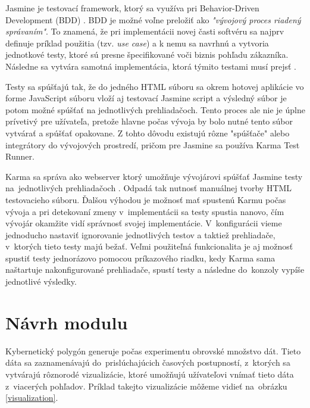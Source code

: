 \documentclass[
  printed, %
  twoside, %
  notable,   %
  nolof,   %
  nolot,   %
]{fithesis3}
\newcommand{\inquotes}[1]{{}"{}#1{}"{}}
\begin{document}
Jasmine je testovací framework, ktorý sa využíva pri Behavior-Driven Development (BDD) \cite{ragonha2013jasmine}. BDD je možné voľne preložiť ako \textit{"vývojový proces riadený správaním"}. To znamená, že pri implementácii novej časti softvéru sa najprv definuje príklad použitia (tzv. \textit{use case}) a k nemu sa navrhnú a vytvoria jednotkové testy, ktoré sú presne špecifikované voči biznis pohľadu zákazníka. Následne sa vytvára samotná implementácia, ktorá týmito testami musí prejsť \cite{nelson2013test}.

Testy sa spúšťajú tak, že do jedného HTML súboru sa okrem hotovej aplikácie vo forme JavaScript súboru vloží aj testovací Jasmine script a výsledný súbor je potom možné spúšťať na jednotlivých prehliadačoch. Tento proces ale nie je úplne prívetivý pre užívateľa, pretože hlavne počas vývoja by bolo nutné tento súbor vytvárať a spúšťať opakovane. Z tohto dôvodu existujú rôzne \inquotes{spúšťače} alebo integrátory do vývojových prostredí, pričom pre Jasmine sa používa Karma Test Runner.

Karma sa správa ako webserver ktorý umožňuje vývojárovi spúšťať Jasmine testy na~jednotlivých prehliadačoch \cite{karma}. Odpadá tak nutnosť manuálnej tvorby HTML testovacieho súboru. Ďalšou výhodou je možnosť mať spustenú Karmu počas vývoja a pri detekovaní zmeny v~implementácii sa testy spustia nanovo, čím vývojár okamžite vidí správnosť svojej implementácie. V~konfigurácii vieme jednoducho nastaviť ignorovanie jednotlivých testov a taktiež prehliadače, v~ktorých tieto testy majú bežať. Veľmi použiteľná funkcionalita je aj možnosť spustiť testy jednorázovo pomocou príkazového riadku, kedy Karma sama naštartuje nakonfigurované prehliadače, spustí testy a následne do~konzoly vypíše jednotlivé výsledky.

\chapter{Návrh modulu}
\label{plan}

Kybernetický polygón generuje počas experimentu obrovské množstvo dát. Tieto dáta sa zaznamenávajú do~prislúchajúcich časových postupností, z~ktorých sa vytvárajú rôznorodé vizualizácie, ktoré umožňujú užívateľovi vnímať tieto dáta z~viacerých pohľadov. Príklad takejto vizualizácie môžeme vidieť na~obrázku \ref{visualization}.
\end{document}
